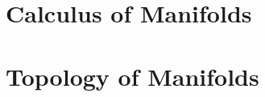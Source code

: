 \documentclass[11pt]{book}
\begin{document}
\setcounter{tocdepth}{1}
\tableofcontents

\part{Calculus of Manifolds}





\part{Topology of Manifolds}


\end{document}
